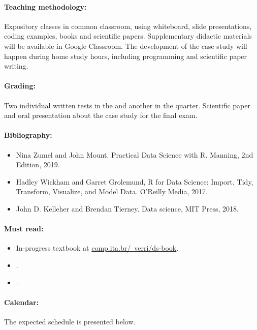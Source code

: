 \paragraph{Teaching methodology:}
Expository classes in common classroom, using whiteboard, slide presentations, coding
examples, books and scientific papers. Supplementary didactic materials will be available
in Google Classroom. The development of the case study will happen during home study
hours, including programming and scientific paper writing.

\paragraph{Grading:} Two individual written tests in the  and another in the  quarter.
Scientific paper and oral presentation about the case study for the final exam.

\paragraph{Bibliography:}
\begin{itemize}
  \item Nina Zumel and John Mount. Practical Data Science with R. Manning, 2nd Edition, 2019.
  \item Hadley Wickham and Garret Grolemund, R for Data Science: Import, Tidy, Transform, Visualize, and Model Data. O’Reilly Media, 2017.
  \item John D. Kelleher and Brendan Tierney. Data science, MIT Press, 2018.
\end{itemize}

\paragraph{Must read:}
\begin{itemize}
  \item In-progress textbook at \href{https://comp.ita.br/~verri/ds-book}{comp.ita.br/~verri/ds-book}.
  \item {}.
  \item {}.
\end{itemize}
\thispagestyle{empty}

\paragraph{Calendar:} The expected schedule is presented below.
\thispagestyle{empty}

